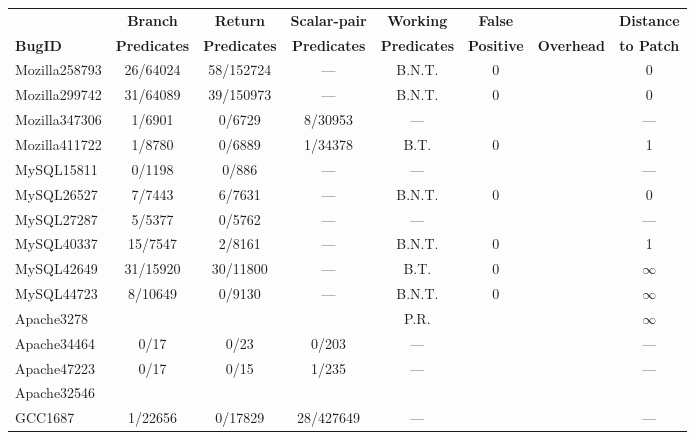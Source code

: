 \begin{table*}
  \centering
  \small
  \begin{tabular}{lccccccc}
    \toprule
               &  {\bf Branch}  &{\bf Return}    &{\bf Scalar-pair}   & {\bf Working}& {\bf False}    &               & {\bf Distance} \\
    {\bf BugID}&{\bf Predicates}&{\bf Predicates}&{\bf Predicates}    & {\bf Predicates}&{\bf Positive}  &{\bf Overhead} &{\bf  to Patch}\\
    \midrule
    Mozilla258793          &  26/64024   &  58/152724      &  ---       & B.N.T.        & 0  & &  0\\
    Mozilla299742          &  31/64089   &  39/150973      &  ---       & B.N.T.        & 0  & &  0\\
    Mozilla347306          &  1/6901     & 0/6729          &  8/30953   & ---           &    & & --- \\
    Mozilla411722          &  1/8780     & 0/6889          &  1/34378   & B.T.          & 0  & &  1 \\
    \midrule
    MySQL15811             & 0/1198      & 0/886           &  ---       & ---           & &   & ---    \\
    MySQL26527             & 7/7443      & 6/7631          &  ---       & B.N.T.        & 0 & & 0      \\
    MySQL27287             & 5/5377      & 0/5762          &  ---       & ---           & &   & ---    \\
    MySQL40337             & 15/7547     & 2/8161          &  ---       & B.N.T.        & 0 & & 1 \\
    MySQL42649             & 31/15920    & 30/11800        &  ---       & B.T.          & 0 & & $\infty$ \\
    MySQL44723             & 8/10649     & 0/9130          &  ---       & B.N.T.        & 0 & & $\infty$ \\
    \midrule
    Apache3278             &             &                 &            & P.R. & &            &  $\infty$ \\
    Apache34464            & 0/17        &  0/23           &  0/203     & ---  & &            & ---\\
    Apache47223            & 0/17        &  0/15           &  1/235     & ---  & &            & --- \\
    Apache32546            &    &  &    &  & & & \\
    \midrule
    GCC1687                & 1/22656    & 0/17829          & 28/427649    & ---  &   &        & --- \\

\end{tabular}
\end{table*}

